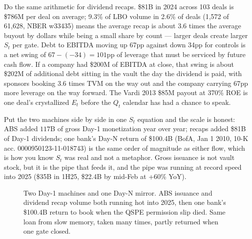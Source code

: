 Do the same arithmetic for dividend recaps. \$81B in 2024 across 103 deals is \$786M per deal on average; 9.3\% of LBO volume in 2.6\% of deals (1,572 of 61,628, NBER w33435) means the average recap is about 3.6 times the average buyout by dollars while being a small share by count — larger deals create larger $S_t$ per gate. Debt to EBITDA moving up 67pp against down 34pp for controls is a net swing of $67 - (-34) = 101$pp of leverage that must be serviced by future cash flow. If a company had \$200M of EBITDA at close, that swing is about \$202M of additional debt sitting in the vault the day the dividend is paid, with sponsors booking 3.6 times TVM on the way out and the company carrying 67pp more leverage on the way forward. The Vardi 2013 \$85M payout at 370\% ROE is one deal's crystallized $E_t$ before the $Q_t$ calendar has had a chance to speak.

Put the two machines side by side in one $S_t$ equation and the scale is honest: ABS added $117$B of gross Day-1 monetization year over year; recaps added \$81B of Day-1 dividends; one bank's Day-N return of \$100.4B (BofA, Jan 1 2010, 10-K acc. 0000950123-11-018743) is the same order of magnitude as either flow, which is how you know $S_t$ was real and not a metaphor. Gross issuance is not vault stock, but it is the pipe that feeds it, and the pipe was running at record speed into 2025 (\$35B in 1H25, \$22.4B by mid-Feb at +60\% YoY).

\begin{figure}[h]
\centering
{}
\caption{Two Day-1 machines and one Day-N mirror. ABS issuance and dividend recap volume both running hot into 2025, then one bank's \$100.4B return to book when the QSPE permission slip died. Same loan from slow memory, taken many times, partly returned when one gate closed.}
\label{fig:timeline-machines}
\end{figure}


